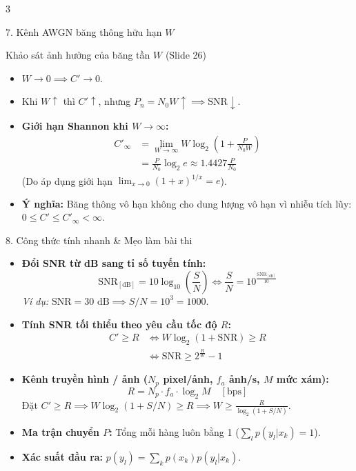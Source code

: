 \documentclass[10pt,landscape,a4paper]{article}
\begin{document}
\begin{multicols*}{3}
\begin{cheatbox}{7. Kênh AWGN băng thông hữu hạn $W$}
\begin{subbox}{Khảo sát ảnh hưởng của băng tần $W$ (Slide 26)}
\begin{itemize}[leftmargin=*,noitemsep]
    \item $W \to 0 \implies C' \to 0$.
    \item Khi $W \uparrow$ thì $C' \uparrow$, nhưng $P_n = N_0 W \uparrow \implies \text{SNR} \downarrow$.
    \item \textbf{Giới hạn Shannon khi $W \to \infty$:}
    \begin{align*}
        C'_\infty &= \lim_{W \to \infty} W \log_2\left(1 + \frac{P}{N_0 W}\right) \\
                  &= \frac{P}{N_0}\log_2 e \approx 1.4427 \frac{P}{N_0}
    \end{align*}
    (Do áp dụng giới hạn $\lim_{x \to 0} (1+x)^{1/x} = e$).
    \item \textbf{Ý nghĩa:} Băng thông vô hạn không cho dung lượng vô hạn vì nhiễu tích lũy: $0 \le C' \le C'_\infty < \infty$.
\end{itemize}
\end{subbox}
\end{cheatbox}

\begin{cheatbox}{8. Công thức tính nhanh \& Mẹo làm bài thi}
\begin{itemize}[leftmargin=*,noitemsep]
    \item \textbf{Đổi SNR từ dB sang tỉ số tuyến tính:}
    \[ \text{SNR}_{[\text{dB}]} = 10 \log_{10}\left(\frac{S}{N}\right) \iff \frac{S}{N} = 10^{\frac{\text{SNR}_{[\text{dB}]}}{10}} \]
    \textit{Ví dụ:} $\text{SNR} = 30\text{ dB} \implies S/N = 10^3 = 1000$.
    \item \textbf{Tính SNR tối thiểu theo yêu cầu tốc độ $R$:}
    \begin{align*}
        C' \ge R &\iff W \log_2(1 + \text{SNR}) \ge R \\
                 &\iff \text{SNR} \ge 2^{\frac{R}{W}} - 1
    \end{align*}
    \item \textbf{Kênh truyền hình / ảnh ($N_p$ pixel/ảnh, $f_a$ ảnh/s, $M$ mức xám):}
    \[ R = N_p \cdot f_a \cdot \log_2 M \quad [\text{bps}] \]
    Đặt $C' \ge R \implies W \log_2(1 + S/N) \ge R \implies W \ge \frac{R}{\log_2(1 + S/N)}$.
    \item \textbf{Ma trận chuyển $P$:} Tổng mỗi hàng luôn bằng 1 ($\sum_l p(y_l|x_k) = 1$).
    \item \textbf{Xác suất đầu ra:} $p(y_l) = \sum_k p(x_k) p(y_l|x_k)$.
\end{itemize}
\end{cheatbox}

\end{multicols*}
\end{document}
